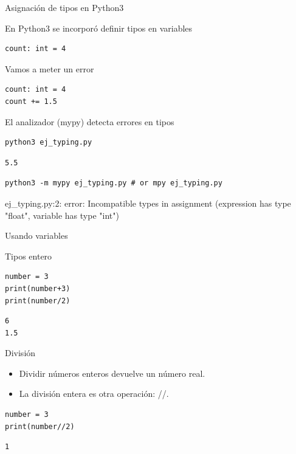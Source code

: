\documentclass[bigger,unknownkeysallowed]{beamer}
\begin{document}
\begin{frame}[fragile,label={sec:orgdc32daa}]{Asignación de tipos en Python3}
 \begin{block}{En Python3 se incorporó definir tipos en variables}
\begin{verbatim}
count: int = 4
\end{verbatim}
\scriptsize
\end{block}
\begin{block}{Vamos a meter un error}
\begin{verbatim}
count: int = 4
count += 1.5
\end{verbatim}
\end{block}

\begin{alertblock}{El analizador (mypy) detecta errores en tipos}
\begin{verbatim}
python3 ej_typing.py
\end{verbatim}
\scriptsize
\begin{verbatim}
5.5
\end{verbatim}
\begin{verbatim}
python3 -m mypy ej_typing.py # or mpy ej_typing.py
\end{verbatim}
\scriptsize
ej\_typing.py:2: error: Incompatible types in assignment (expression has type "float", variable has type "int")
\end{alertblock}
\end{frame}

\begin{frame}[fragile,label={sec:org6ea0fcf}]{Usando variables}
 \begin{block}{Tipos entero}
\begin{verbatim}
number = 3
print(number+3)
print(number/2)
\end{verbatim}
\scriptsize
\begin{verbatim}
6
1.5
\end{verbatim}
\end{block}

\begin{alertblock}{División}
\begin{itemize}
\item Dividir números enteros devuelve un número real.
\item La división entera es otra operación: //.
\end{itemize}
\end{alertblock}

\begin{block}{}
\begin{verbatim}
number = 3
print(number//2)
\end{verbatim}
\scriptsize
\begin{verbatim}
1
\end{verbatim}
\end{block}
\end{frame}
\end{document}

